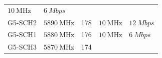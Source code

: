 \documentclass[letterpaper,11pt]{article}
\begin{document}
\begin{onehalfspace}
\begin{longtable}[]{@{}lllll@{}}
\begin{minipage}[t]{0.14\columnwidth}
\(\SI{10}{\mega\hertz}\)\strut
\end{minipage} & \begin{minipage}[t]{0.18\columnwidth}\raggedright\strut
\(\SI{6}{Mbps}\)\strut
\end{minipage}\tabularnewline
\begin{minipage}[t]{0.08\columnwidth}\raggedright\strut
G5-SCH2\strut
\end{minipage} & \begin{minipage}[t]{0.30\columnwidth}\raggedright\strut
\(\SI{5890}{\mega\hertz}\)\strut
\end{minipage} & \begin{minipage}[t]{0.16\columnwidth}\raggedright\strut
178\strut
\end{minipage} & \begin{minipage}[t]{0.14\columnwidth}\raggedright\strut
\(\SI{10}{\mega\hertz}\)\strut
\end{minipage} & \begin{minipage}[t]{0.18\columnwidth}\raggedright\strut
\(\SI{12}{Mbps}\)\strut
\end{minipage}\tabularnewline
\begin{minipage}[t]{0.08\columnwidth}\raggedright\strut
G5-SCH1\strut
\end{minipage} & \begin{minipage}[t]{0.30\columnwidth}\raggedright\strut
\(\SI{5880}{\mega\hertz}\)\strut
\end{minipage} & \begin{minipage}[t]{0.16\columnwidth}\raggedright\strut
176\strut
\end{minipage} & \begin{minipage}[t]{0.14\columnwidth}\raggedright\strut
\(\SI{10}{\mega\hertz}\)\strut
\end{minipage} & \begin{minipage}[t]{0.18\columnwidth}\raggedright\strut
\(\SI{6}{Mbps}\)\strut
\end{minipage}\tabularnewline
\begin{minipage}[t]{0.08\columnwidth}\raggedright\strut
G5-SCH3\strut
\end{minipage} & \begin{minipage}[t]{0.30\columnwidth}\raggedright\strut
\(\SI{5870}{\mega\hertz}\)\strut
\end{minipage} & \begin{minipage}[t]{0.16\columnwidth}\raggedright\strut
174\strut
\end{minipage} & \begin{minipage}[t]{0.14\columnwidth}\raggedright\strut

\end{minipage}
\end{longtable}
\end{onehalfspace}
\end{document}
